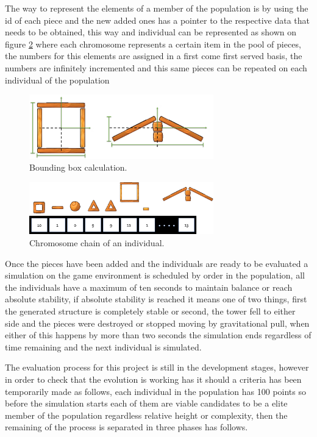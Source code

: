 \documentclass[conference]{IEEEtran}
\begin{document}
The way to represent the elements of a member of the population is by using the id of each piece and the new added ones has a pointer to the respective data that needs to be obtained, this way and individual can be represented as shown on figure \ref{old_chrom} where each chromosome represents a certain item in the pool of pieces, the numbers for this elements are assigned in a first come first served basis, the numbers are infinitely incremented and this same pieces can be repeated on each individual of the population

\begin{figure}[htbp]
\centerline{\includegraphics[width=80mm]{Images/bounding_box_calculation.png}}
\caption{Bounding box calculation.}
\label{bounding_boc_calc}
\end{figure}

\begin{figure}[htbp]
\centerline{\includegraphics[width=80mm]{Images/chromosome_chain_example.png}}
\caption{Chromosome chain of an individual.}
\label{old_chrom}
\end{figure}

Once the pieces have been added and the individuals are ready to be evaluated a simulation on the game environment is scheduled by order in the population, all the individuals have a maximum of ten seconds to maintain balance or reach absolute stability, if absolute stability is reached it means one of two things, first the generated structure is completely stable or second, the tower fell to either side and the pieces were destroyed or stopped moving by gravitational pull, when either of this happens by more than two seconds the simulation ends regardless of time remaining and the next individual is simulated.

The evaluation process for this project is still in the development stages, however in order to check that the evolution is working has it should a criteria has been temporarily made as follows, each individual in the population has 100 points so before the simulation starts each of them are viable candidates to be a elite member of the population regardless relative height or complexity, then the remaining of the process is separated in three phases has follows.
\end{document}
